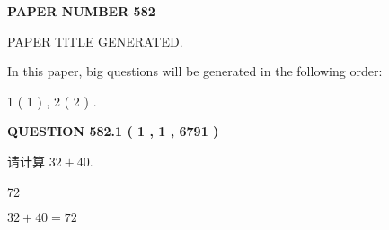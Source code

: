 \documentclass{ctexart}
\begin{document}
   
   
   
\newpage 
\setcounter{page}{ 
   582001 } 
   
   
   
   
 {\textbf{ \Large{ PAPER NUMBER  582  }}}
   
   
\vspace{0.2in}
   
   
   
   
   
   
   
   
 \vspace{0.2in}
 
 
 
 
   
   
 PAPER TITLE GENERATED.
   
   
   
\vspace{0.2in}
   
In this paper, big questions will be generated in the following order: 
   
   
   1 ( 1 )
 ,
   2 ( 2 )
 .
  
\vspace{0.2in}
  
{\textbf{\Large{QUESTION
582.1 
 ( 1 , 1 , 6791 )
}}}
  
  
 
请计算 $ %
32 +  %
40 $.
 
 
 
\noindent{}
 
 

72
 
 
\noindent{}
 
 

 
 
 
\noindent{}
 
 

$ %
32 +  %
40=   %
72$
 
 
\noindent{}
 
 

 
   
   
   
\end{document}
